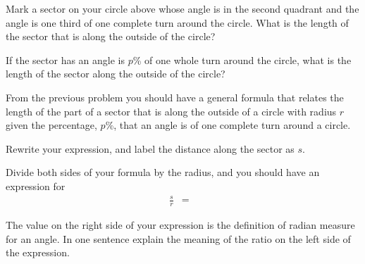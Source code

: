 \begin{problem}
\begin{subproblem}
    \vspace{4em}

  \item Mark a sector on your circle above whose angle is in the
    second quadrant and the angle is one third of one complete
    turn around the circle. What is the length of the sector that is
    along the outside of the circle?


    \vspace{4em}

  \item If the sector has an angle is $p$\% of one whole turn around
    the circle, what is the length of the sector along the outside of
    the circle?
    \vspace{4em}

  \end{subproblem}

\clearpage

\item From the previous problem you should have a general formula that
  relates the length of the part of a sector that is along the outside
  of a circle with radius $r$ given the percentage, $p$\%, that an
  angle is of one complete turn around a circle.

  \begin{subproblem}
  \item Rewrite your expression, and label the distance along the
    sector as $s$.
    \vfill
  \item Divide both sides of your formula by the radius, and you
    should have an expression for 
    \begin{eqnarray*}
    \frac{s}{r} & = & 
    \end{eqnarray*}

  \item The value on the right side of your expression is the
    definition of radian measure for an angle. In one sentence explain
    the meaning of the ratio on the left side of the expression.
    
    \vfill

  \end{subproblem}

  \clearpage


\end{problem}
